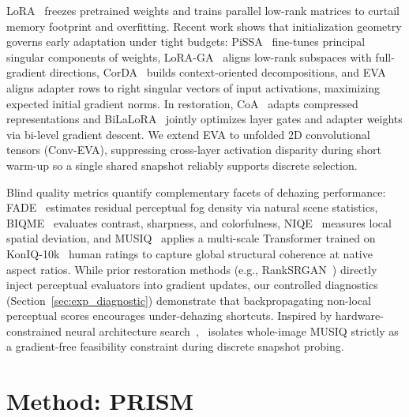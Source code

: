\documentclass[10pt,twocolumn,letterpaper]{article}
\begin{document}
LoRA~\cite{lora2022} freezes pretrained weights and trains parallel low-rank matrices to curtail memory footprint and overfitting. Recent work shows that initialization geometry governs early adaptation under tight budgets: PiSSA~\cite{pissa2024} fine-tunes principal singular components of weights, LoRA-GA~\cite{loraga2024} aligns low-rank subspaces with full-gradient directions, CorDA~\cite{corda2024} builds context-oriented decompositions, and EVA~\cite{eva2025} aligns adapter rows to right singular vectors of input activations, maximizing expected initial gradient norms. In restoration, CoA~\cite{coa2025} adapts compressed representations and BiLaLoRA~\cite{bilalora2026} jointly optimizes layer gates and adapter weights via bi-level gradient descent. We extend EVA to unfolded 2D convolutional tensors (Conv-EVA), suppressing cross-layer activation disparity during short warm-up so a single shared snapshot reliably supports discrete selection.

Blind quality metrics quantify complementary facets of dehazing performance: FADE~\cite{fade2015} estimates residual perceptual fog density via natural scene statistics, BIQME~\cite{biqme2018} evaluates contrast, sharpness, and colorfulness, NIQE~\cite{niqe2013} measures local spatial deviation, and MUSIQ~\cite{musiq2021} applies a multi-scale Transformer trained on KonIQ-10k~\cite{koniq2020} human ratings to capture global structural coherence at native aspect ratios. While prior restoration methods (e.g., RankSRGAN~\cite{ranksrgan2019}) directly inject perceptual evaluators into gradient updates, our controlled diagnostics (Section~\ref{sec:exp_diagnostic}) demonstrate that backpropagating non-local perceptual scores encourages under-dehazing shortcuts. Inspired by hardware-constrained neural architecture search~\cite{mnasnet2019}, \method~isolates whole-image MUSIQ strictly as a gradient-free feasibility constraint during discrete snapshot probing.

\section{Method: PRISM}
\end{document}
